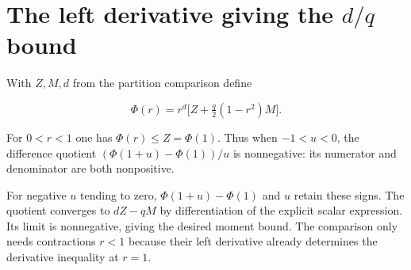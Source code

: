 \documentclass[11pt,a4paper]{article}
\begin{document}
\section{\texorpdfstring{The left derivative giving the \(d/q\) bound}{The left derivative giving the d/q bound}}


With \(Z,M,d\) from the partition comparison define

\[\Phi(r)=r^d\bigl[Z+\tfrac q2(1-r^2)M\bigr].\]

For \(0<r<1\) one has \(\Phi(r)\le Z=\Phi(1)\). Thus when \(-1<u<0\), the difference quotient \((\Phi(1+u)-\Phi(1))/u\) is nonnegative: its numerator and denominator are both nonpositive.



For negative \(u\) tending to zero, \(\Phi(1+u)-\Phi(1)\) and \(u\) retain these signs. The quotient converges to \(dZ-qM\) by differentiation of the explicit scalar expression. Its limit is nonnegative, giving the desired moment bound. The comparison only needs contractions \(r<1\) because their left derivative already determines the derivative inequality at \(r=1\).
\end{document}
